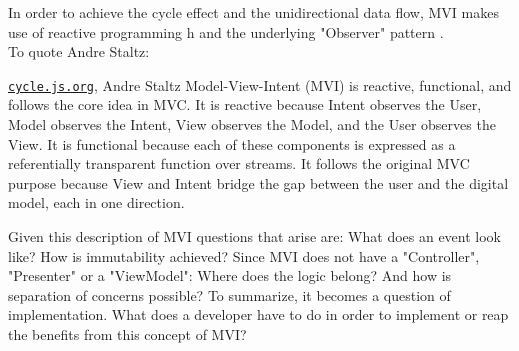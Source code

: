 In order to achieve the cycle effect and the unidirectional data flow, MVI makes use of reactive programming 
h\cite{reactiveProgrammingIntroAndreStaltz} 
and the underlying "Observer" pattern 
\cite{wikipediaObserverPattern}.
\\
To quote Andre Staltz:
\begin{pquotation}{\href{https://cycle.js.org/model-view-intent.html#model-view-intent-what-mvc-is-really-about}{\nolinkurl{cycle.js.org}}, Andre Staltz}
    Model-View-Intent (MVI) is reactive, functional, and follows the core idea in MVC. It is reactive because Intent observes the User, Model observes the Intent, 
    View observes the Model, and the User observes the View. It is functional because each of these components is expressed as a referentially transparent function 
    over streams. It follows the original MVC purpose because View and Intent bridge the gap between the user and the digital model, each in one direction.
\end{pquotation}
Given this description of MVI questions that arise are: What does an event look like? How is immutability achieved?
Since MVI does not have a "Controller", "Presenter" or a "ViewModel": Where does the logic belong? And how is separation of concerns possible?
To summarize, it becomes a question of implementation. What does a developer have to do in order to implement or reap the benefits from this concept of MVI?